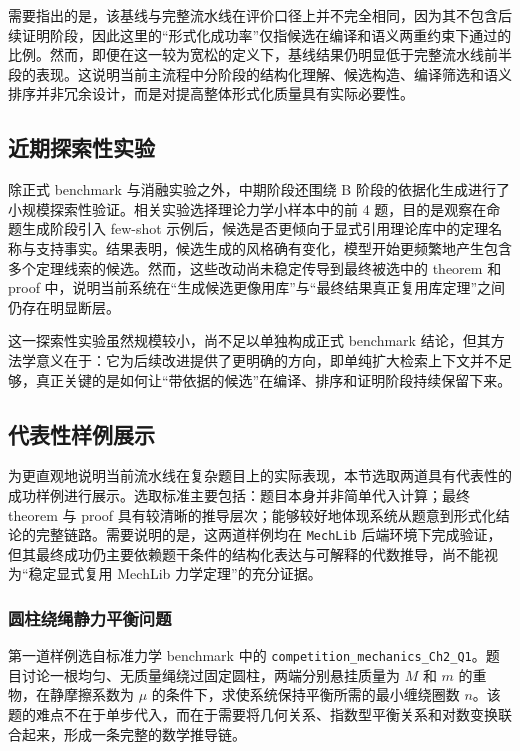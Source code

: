 \documentclass[12pt,a4paper]{ctexart}
\begin{document}
需要指出的是，该基线与完整流水线在评价口径上并不完全相同，因为其不包含后续证明阶段，因此这里的“形式化成功率”仅指候选在编译和语义两重约束下通过的比例。然而，即便在这一较为宽松的定义下，基线结果仍明显低于完整流水线前半段的表现。这说明当前主流程中分阶段的结构化理解、候选构造、编译筛选和语义排序并非冗余设计，而是对提高整体形式化质量具有实际必要性。

\subsection{近期探索性实验}

除正式 benchmark 与消融实验之外，中期阶段还围绕 B 阶段的依据化生成进行了小规模探索性验证。相关实验选择理论力学小样本中的前 4 题，目的是观察在命题生成阶段引入 few-shot 示例后，候选是否更倾向于显式引用理论库中的定理名称与支持事实。结果表明，候选生成的风格确有变化，模型开始更频繁地产生包含多个定理线索的候选。然而，这些改动尚未稳定传导到最终被选中的 theorem 和 proof 中，说明当前系统在“生成候选更像用库”与“最终结果真正复用库定理”之间仍存在明显断层。

这一探索性实验虽然规模较小，尚不足以单独构成正式 benchmark 结论，但其方法学意义在于：它为后续改进提供了更明确的方向，即单纯扩大检索上下文并不足够，真正关键的是如何让“带依据的候选”在编译、排序和证明阶段持续保留下来。


\subsection{代表性样例展示}

为更直观地说明当前流水线在复杂题目上的实际表现，本节选取两道具有代表性的成功样例进行展示。选取标准主要包括：题目本身并非简单代入计算；最终 theorem 与 proof 具有较清晰的推导层次；能够较好地体现系统从题意到形式化结论的完整链路。需要说明的是，这两道样例均在 \texttt{MechLib} 后端环境下完成验证，但其最终成功仍主要依赖题干条件的结构化表达与可解释的代数推导，尚不能视为“稳定显式复用 MechLib 力学定理”的充分证据。

\subsubsection{圆柱绕绳静力平衡问题}

第一道样例选自标准力学 benchmark 中的 \texttt{competition\_mechanics\_Ch2\_Q1}。题目讨论一根均匀、无质量绳绕过固定圆柱，两端分别悬挂质量为 $M$ 和 $m$ 的重物，在静摩擦系数为 $\mu$ 的条件下，求使系统保持平衡所需的最小缠绕圈数 $n$。该题的难点不在于单步代入，而在于需要将几何关系、指数型平衡关系和对数变换联合起来，形成一条完整的数学推导链。
\end{document}
